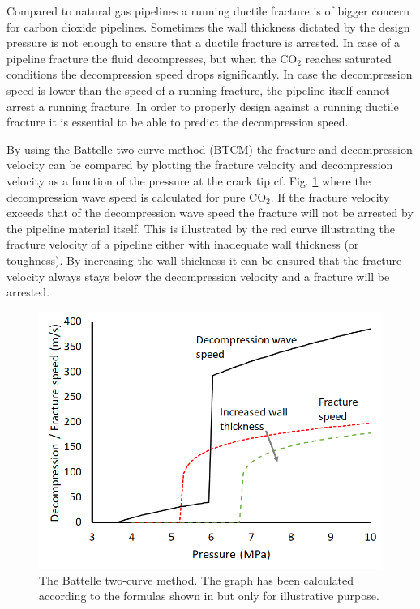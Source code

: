 \documentclass[a4paper, 10pt, twocolumn, twoside]{scrartcl}
\begin{document}
Compared to natural gas pipelines a running ductile fracture is of bigger concern for carbon dioxide pipelines. Sometimes the wall thickness dictated by the design pressure is not enough to ensure that a ductile fracture is arrested. In case of a pipeline fracture the fluid decompresses, but when the CO$_2$ reaches saturated conditions the decompression speed drops significantly. In case the decompression speed is lower than the speed of a running fracture, the pipeline itself cannot arrest a running fracture. In order to properly design against a running ductile fracture it is essential to be able to predict the decompression speed.     

By using the Battelle two-curve method (BTCM) \cite{EiberMaxeyW.A.BubenikT.A.AmericanGasAssociation.PipelineResearchCommittee.LinePipeResearchSupervisoryCommittee.1993} the fracture and decompression velocity can be compared by plotting the fracture velocity and decompression velocity as a function of the pressure at the crack tip cf. Fig. \ref{fig:btcm} where the decompression wave speed is calculated for pure CO$_2$. If the fracture velocity exceeds that of the decompression wave speed the fracture will not be arrested by the pipeline material itself. This is illustrated by the red curve illustrating the fracture velocity of a pipeline either with inadequate wall thickness (or toughness). By increasing the wall thickness it can be ensured that the fracture velocity always stays below the decompression velocity and a fracture will be arrested.    

\begin{figure}[!ht]
	\centering
	\includegraphics[width=\columnwidth]{./Bilder/BTCM.png}
	\caption{The Battelle two-curve method. The graph has been calculated according to the formulas shown in \cite{Hu2021} but only for illustrative purpose.}
	\label{fig:btcm}
\end{figure}
\end{document}
